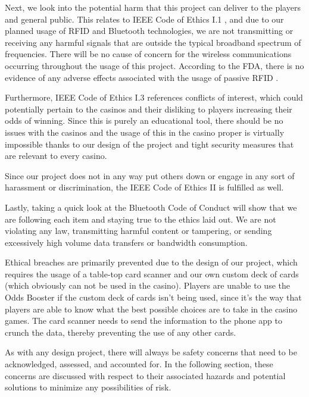 \documentclass[12pt]{article}
\begin{document}
Next, we look into the potential harm that this project can deliver to the players and general public. This relates to IEEE Code of Ethics I.1 \cite{IEEE_ethics}, and due to our planned usage of RFID and Bluetooth technologies, we are not transmitting or receiving any harmful signals that are outside the typical broadband spectrum of frequencies. There will be no cause of concern for the wireless communications occurring throughout the usage of this project. According to the FDA, there is no evidence of any adverse effects associated with the usage of passive RFID \cite{FDA_RFID}.

Furthermore, IEEE Code of Ethics I.3 \cite{IEEE_ethics} references conflicts of interest, which could potentially pertain to the casinos and their disliking to players increasing their odds of winning. Since this is purely an educational tool, there should be no issues with the casinos and the usage of this in the casino proper is virtually impossible thanks to our design of the project and tight security measures that are relevant to every casino.

Since our project does not in any way put others down or engage in any sort of harassment or discrimination, the IEEE Code of Ethics II \cite{IEEE_ethics} is fulfilled as well. 

Lastly, taking a quick look at the Bluetooth Code of Conduct \cite{BT_conduct} will show that we are following each item and staying true to the ethics laid out. We are not violating any law, transmitting harmful content or tampering, or sending excessively high volume data transfers or bandwidth consumption.

Ethical breaches are primarily prevented due to the design of our project, which requires the usage of a table-top card scanner and our own custom deck of cards (which obviously can not be used in the casino). Players are unable to use the Odds Booster if the custom deck of cards isn't being used, since it's the way that players are able to know what the best possible choices are to take in the casino games. The card scanner needs to send the information to the phone app to crunch the data, thereby preventing the use of any other cards. 

As with any design project, there will always be safety concerns that need to be acknowledged, assessed, and accounted for. In the following section, these concerns are discussed with respect to their associated hazards and potential solutions to minimize any possibilities of risk.
\end{document}
